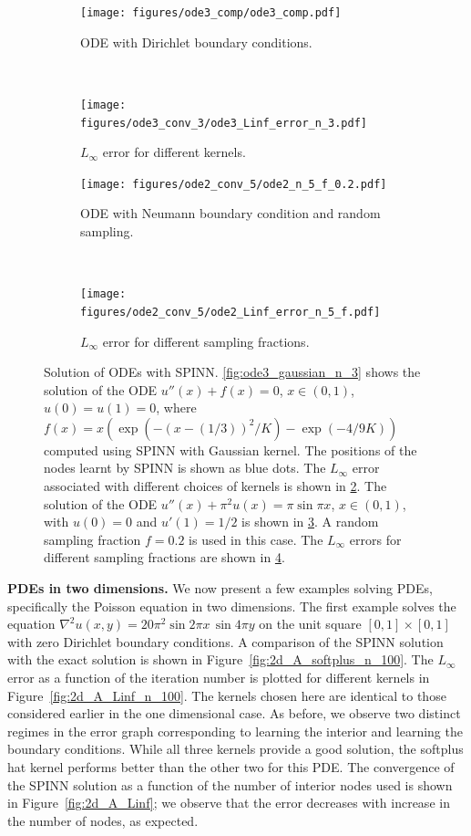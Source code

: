 \documentclass[12pt]{article}
\begin{document}
\begin{figure}[htpb]
\begin{subfigure}{0.5\textwidth}
\centering
\texttt{[image: figures/ode3\_comp/ode3\_comp.pdf]}
\caption{ODE with Dirichlet boundary conditions.}
\label{fig:ode3_gaussian_n_3_comp}
\end{subfigure}
~
\begin{subfigure}{0.5\textwidth}
\centering
\texttt{[image: figures/ode3\_conv\_3/ode3\_Linf\_error\_n\_3.pdf]}
\caption{$L_{\infty}$ error for different kernels.}
\label{fig:ode3_Linf_n_3}  
\end{subfigure}

\begin{subfigure}{0.5\textwidth}
\centering
\texttt{[image: figures/ode2\_conv\_5/ode2\_n\_5\_f\_0.2.pdf]}
\caption{ODE with Neumann boundary condition and random sampling.}
\label{fig:ode2_n_5_f_0p2} 
\end{subfigure}
~
\begin{subfigure}{0.5\textwidth}
\centering
\texttt{[image: figures/ode2\_conv\_5/ode2\_Linf\_error\_n\_5\_f.pdf]}
\caption{$L_{\infty}$ error for different sampling fractions.}
\label{fig:ode2_n_5_Linf}    
\end{subfigure}
\caption{Solution of ODEs with SPINN. \ref{fig:ode3_gaussian_n_3} shows the solution of the ODE $u''(x) + f(x) = 0$, $x \in (0,1)$, $u(0) = u(1) = 0$, where $f(x) = x(\exp (-(x - (1/3))^2/K) - \exp (-4/9K))$ computed using SPINN with Gaussian kernel. The positions of the nodes learnt by SPINN is shown as blue dots. The $L_{\infty}$ error associated with different choices of kernels is shown in \ref{fig:ode3_Linf_n_3}. The solution of the ODE $u''(x) + \pi^2 u(x) = \pi \sin \pi x$, $x \in (0,1)$, with $u(0) = 0$ and $u'(1) = 1/2$ is shown in \ref{fig:ode2_n_5_f_0p2}. A random sampling fraction $f=0.2$ is used in this case. The $L_{\infty}$ errors for different sampling fractions are shown in \ref{fig:ode2_n_5_Linf}.}
\label{fig:spinn_ode}
\end{figure}

\textbf{PDEs in two dimensions.}
We now present a few examples solving PDEs, specifically the Poisson equation in two dimensions. The first example solves the equation $\nabla^2 u(x, y) = 20\pi^2 \sin 2\pi x \, \sin 4 \pi y$ on the unit square $[0,1]\times[0,1]$ with zero Dirichlet boundary conditions. A comparison of the SPINN solution with the exact solution is shown in Figure~\ref{fig:2d_A_softplus_n_100}. The $L_{\infty}$ error as a function of the iteration number is plotted for different kernels in Figure~\ref{fig:2d_A_Linf_n_100}. The kernels chosen here are identical to those considered earlier in the one dimensional case. As before, we observe two distinct regimes in the error graph corresponding to learning the interior and learning the boundary conditions. While all three kernels provide a good solution, the softplus hat kernel performs better than the other two for this PDE. The convergence of the SPINN solution as a function of the number of interior nodes used is shown in Figure~\ref{fig:2d_A_Linf}; we observe that the error decreases with increase in the number of nodes, as expected. 
\end{document}
